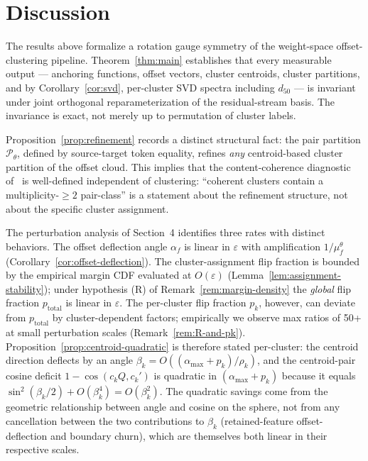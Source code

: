 \documentclass[11pt,letterpaper]{article}
\theoremstyle{definition}
\DeclareMathOperator{\cossim}{cos}
\begin{document}
\section{Discussion}

The results above formalize a rotation gauge symmetry of the weight-space offset-clustering pipeline. Theorem~\ref{thm:main} establishes that every measurable output --- anchoring functions, offset vectors, cluster centroids, cluster partitions, and by Corollary~\ref{cor:svd}, per-cluster SVD spectra including $d_{50}$ --- is invariant under joint orthogonal reparameterization of the residual-stream basis. The invariance is exact, not merely up to permutation of cluster labels.

Proposition~\ref{prop:refinement} records a distinct structural fact: the pair partition $\mathcal{P}_\theta$, defined by source-target token equality, refines \emph{any} centroid-based cluster partition of the offset cloud. This implies that the content-coherence diagnostic of~\citep{cluster_size_confound} is well-defined independent of clustering: ``coherent clusters contain a multiplicity-$\geq 2$ pair-class'' is a statement about the refinement structure, not about the specific cluster assignment.

The perturbation analysis of Section~4 identifies three rates with distinct behaviors. The offset deflection angle $\alpha_f$ is linear in $\varepsilon$ with amplification $1 / \mu_f^\theta$ (Corollary~\ref{cor:offset-deflection}). The cluster-assignment flip fraction is bounded by the empirical margin CDF evaluated at $O(\varepsilon)$ (Lemma~\ref{lem:assignment-stability}); under hypothesis (R) of Remark~\ref{rem:margin-density} the \emph{global} flip fraction $p_{\mathrm{total}}$ is linear in $\varepsilon$. The per-cluster flip fraction $p_k$, however, can deviate from $p_{\mathrm{total}}$ by cluster-dependent factors; empirically we observe max ratios of 50+ at small perturbation scales (Remark~\ref{rem:R-and-pk}). Proposition~\ref{prop:centroid-quadratic} is therefore stated per-cluster: the centroid direction deflects by an angle $\beta_k = O((\alpha_{\max} + p_k)/\rho_k)$, and the centroid-pair cosine deficit $1 - \cossim(c_k Q, c_k')$ is quadratic in $(\alpha_{\max} + p_k)$ because it equals $\sin^2(\beta_k/2) + O(\beta_k^4) = O(\beta_k^2)$. The quadratic savings come from the geometric relationship between angle and cosine on the sphere, not from any cancellation between the two contributions to $\beta_k$ (retained-feature offset-deflection and boundary churn), which are themselves both linear in their respective scales.
\end{document}
